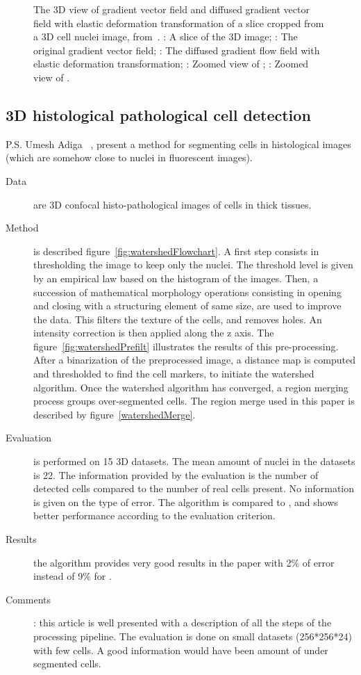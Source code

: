 \begin{figure}[h]
\caption{%
The 3D view of gradient vector field and diffused gradient vector field with elastic deformation transformation of a slice cropped from a 3D cell nuclei image, from~\cite{li20073}.
: A slice of the 3D image;
: The original gradient vector field;
: The diffused gradient flow field with elastic deformation transformation;
: Zoomed view of ;
: Zoomed view of .}
\end{figure}
\clearpage

\subsection*{3D histological pathological cell detection}
 P.S. Umesh Adiga {\etal}~\cite{umesh2001efficient}, present a method for segmenting cells in histological images 
  (which are somehow close to nuclei in fluorescent images).
  \begin{description}
  \item[Data] are 3D confocal histo-pathological images of cells in thick tissues.
  \item[Method] is described figure~\ref{fig:watershedFlowchart}.
  A first step consists in thresholding the image to keep only the nuclei. The threshold level is given by an empirical law based on the histogram of the images.
  Then, a succession of mathematical morphology operations consisting in opening and closing with a structuring element of same size, are used to improve the data. 
  This filters the texture of the cells, and removes holes.
  An intensity correction is then applied along the z axis. The figure~\ref{fig:watershedPrefilt} illustrates the results of this pre-processing.
  After a binarization of the preprocessed image, a distance map is computed and thresholded to find the cell markers, to initiate the watershed algorithm.
  Once the watershed algorithm has converged, a region merging process groups over-segmented cells. The region merge used in this paper is described by figure~\ref{watershedMerge}.
  \item[Evaluation] is performed on 15 3D datasets. The mean amount of nuclei in the datasets is 22. The information provided by the evaluation is the number of detected cells compared to the number of real cells present. No information is given on the type of error. The algorithm is compared to \cite{malpica1997applying}, and shows better performance according to the evaluation criterion.
  \item[Results] the algorithm provides very good results in the paper with 2\% of error instead of 9\% for \cite{malpica1997applying}.
  \item[Comments]: this article is well presented with a description of all the steps of the processing pipeline.
  The evaluation is done on small datasets (256*256*24) with few cells. A good information would have been amount of under segmented cells. 
\end{description}
